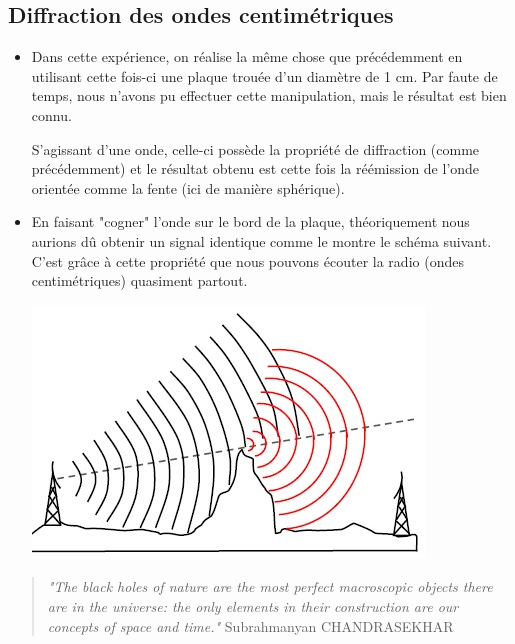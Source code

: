 \documentclass[12pt,a4paper]{article}
\begin{document}
	\subsection{Diffraction des ondes centimétriques}
	\begin{itemize}[label=$\circ$]
		\item Dans cette expérience, on réalise la même chose que précédemment en utilisant cette fois-ci une plaque trouée d'un diamètre de 1 cm. Par faute de temps, nous n'avons pu effectuer cette manipulation, mais le résultat est bien connu. 
		
		S'agissant d'une onde, celle-ci possède la propriété de diffraction (comme précédemment) et le résultat obtenu est cette fois la réémission de l'onde orientée comme la fente (ici de manière sphérique).
		
		\item En faisant "cogner" l'onde sur le bord de la plaque, théoriquement nous aurions dû obtenir un signal identique comme le montre le schéma suivant. C'est grâce à cette propriété que nous pouvons écouter la radio (ondes centimétriques) quasiment partout. 
		\begin{center}
			\includegraphics[scale=0.5]{schem4}
			
		\end{center}
	\end{itemize} 
	\begin{quotation}
		\textit{"The black holes of nature are the most perfect macroscopic objects there are in the universe: the only elements in their construction are our concepts of space and time."} Subrahmanyan CHANDRASEKHAR
	\end{quotation}
	
\end{document}
